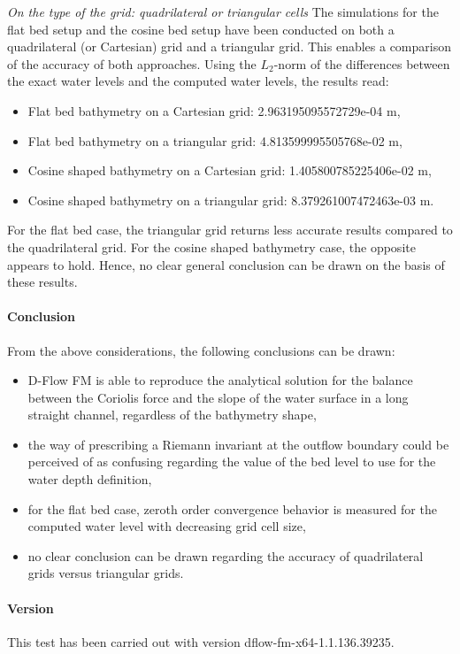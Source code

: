 \emph{On the type of the grid: quadrilateral or triangular cells}\newline
The simulations for the flat bed setup and the cosine bed setup have been conducted on both a quadrilateral (or Cartesian) grid and a triangular grid. This enables a comparison of the accuracy of both approaches. Using the $L_2$-norm of the differences between the exact water levels and the computed water levels, the results read:
\begin{itemize}
\item Flat bed bathymetry on a Cartesian grid: 2.963195095572729e-04 m,
\item Flat bed bathymetry on a triangular grid: 4.813599995505768e-02 m,
\item Cosine shaped bathymetry on a Cartesian grid: 1.405800785225406e-02 m,
\item Cosine shaped bathymetry on a triangular grid: 8.379261007472463e-03 m.
\end{itemize}
For the flat bed case, the triangular grid returns less accurate results compared to the quadrilateral grid. For the cosine shaped bathymetry case, the opposite appears to hold. Hence, no clear general conclusion can be drawn on the basis of these results.





\paragraph*{Conclusion}
From the above considerations, the following conclusions can be drawn:
\begin{itemize}
\item D-Flow FM is able to reproduce the analytical solution for the balance between the Coriolis force and the slope of the water surface in a long straight channel, regardless of the bathymetry shape,
\item the way of prescribing a Riemann invariant at the outflow boundary could be perceived of as confusing regarding the value of the bed level to use for the water depth definition,
\item for the flat bed case, zeroth order convergence behavior is measured for the computed water level with decreasing grid cell size,
\item no clear conclusion can be drawn regarding the accuracy of quadrilateral grids versus triangular grids.
\end{itemize}



\paragraph*{Version}
This test has been carried out with version dflow-fm-x64-1.1.136.39235.



